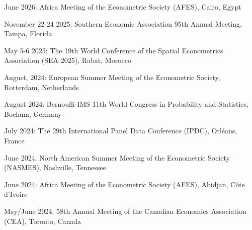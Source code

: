 \documentclass[12pt,letterpaper]{article}
\renewenvironment{itemize}{
  \begin{list}{}{
    \setlength{\leftmargin}{1.5em}
  }
}{
  \end{list}
}
\begin{document}
\begin{itemize}
  
  \item June 2026: Africa Meeting of the Econometric Society (AFES), Cairo, Egypt
  
  \item November 22-24 2025: Southern Economic Association 95th Annual Meeting, Tampa, Florida
  
  
  \item May 5-6 2025: The 19th World Conference of the Spatial Econometrics Association (SEA 2025), Rabat, Morocco
  
  \item August, 2024: European Summer Meeting of the Econometric Society, Rotterdam, Netherlands
  
  \item August 2024: Bernoulli-IMS 11th World Congress in Probability and Statistics, Bochum, Germany
  
  \item July 2024: The 29th International Panel Data Conference (IPDC), Orléans, France
  
  \item June 2024: North American Summer Meeting of the Econometric Society (NASMES), Nashville, Tennessee
  
  \item June 2024: Africa Meeting of the Econometric Society (AFES), Abidjan, Côte d'Ivoire
  
  \item May/June 2024: 58th Annual Meeting of the Canadian Economics Association (CEA), Toronto, Canada


\end{itemize}
\end{document}
